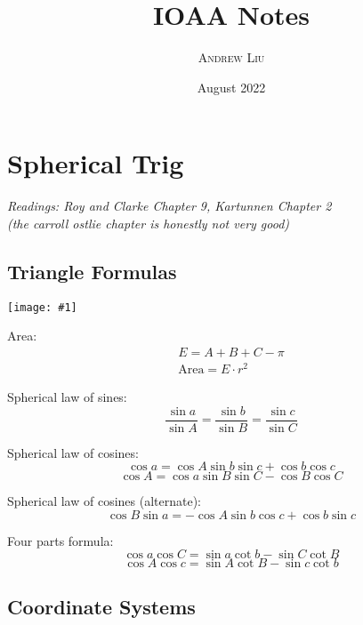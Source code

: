 \documentclass[11pt]{article}
\title{\huge {\fontfamily{lmss}\selectfont
\textbf{IOAA Notes}}}
\author{\scshape \Large Andrew Liu}
\date{{\fontfamily{cmr}\selectfont August 2022}}
\newcommand{\image}[1]{
\begin{center}
    \texttt{[image: \#1]}
\end{center}

}
\begin{document}
\maketitle

\section{Spherical Trig}

\textit{Readings: Roy and Clarke Chapter 9, Kartunnen Chapter 2 \\(the carroll ostlie chapter is honestly not very good)}

\subsection{Triangle Formulas}

\image{images/triangle.png}

Area: 
\begin{align*}
    E = A + B + C - \pi \\
    \text{Area} = E\cdot r^2
\end{align*}

Spherical law of sines: 
\begin{equation*}
    \frac{\sin{a}}{\sin{A}} = \frac{\sin{b}}{\sin{B}} =\frac{\sin{c}}{\sin{C}}
\end{equation*}

Spherical law of cosines: 
\begin{equation*}
    \cos{a} = \cos{A}\sin{b}\sin{c}+\cos{b}\cos{c}
\end{equation*}
\begin{equation*}
    \cos{A} = \cos{a}\sin{B}\sin{C}-\cos{B}\cos{C}
\end{equation*}

Spherical law of cosines (alternate): 
\begin{equation*}
    \cos{B}\sin{a} = -\cos{A}\sin{b}\cos{c}+\cos{b}\sin{c}
\end{equation*}

Four parts formula: 
\begin{equation*}
    \cos{a}\cos{C} = \sin{a}\cot{b} - \sin{C}\cot{B}
\end{equation*}
\begin{equation*}
    \cos{A}\cos{c} = \sin{A}\cot{B} - \sin{c}\cot{b}
\end{equation*}

\subsection{Coordinate Systems}
\end{document}
